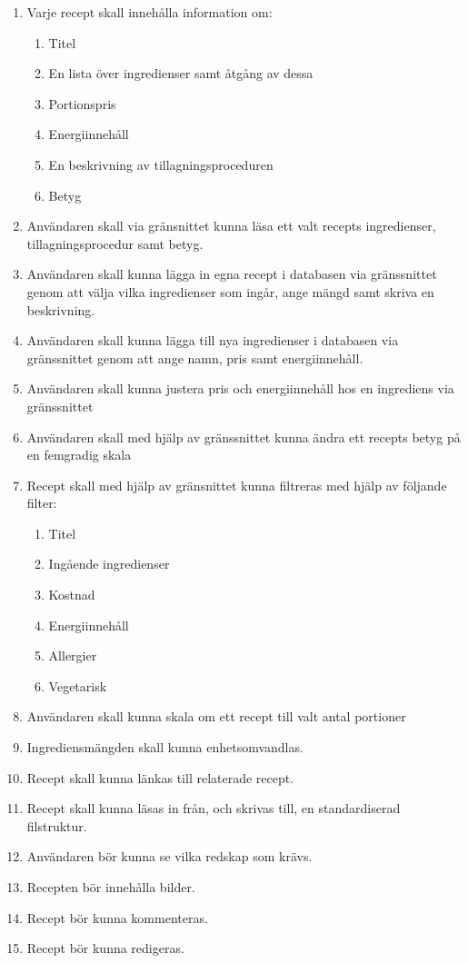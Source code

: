 \renewcommand{\labelenumii}{\theenumii}
\renewcommand{\theenumii}{\theenumi.\arabic{enumii}.}

\begin{enumerate}
\item Varje recept skall innehålla information om:
  \begin{enumerate}
    \item Titel
    \item En lista över ingredienser samt åtgång av dessa
    \item Portionspris
    \item Energiinnehåll
    \item En beskrivning av tillagningsproceduren
    \item Betyg
  \end{enumerate}
\item Användaren skall via gränsnittet kunna läsa ett valt recepts ingredienser, tillagningsprocedur samt betyg.
\item Användaren skall kunna lägga in egna recept i databasen via gränssnittet genom att välja vilka ingredienser som ingår, ange mängd samt skriva en beskrivning.
\item Användaren skall kunna lägga till nya ingredienser i databasen via gränssnittet genom att ange namn, pris samt energiinnehåll.
\item Användaren skall kunna justera pris och energiinnehåll hos en ingrediens via gränssnittet
\item Användaren skall med hjälp av gränssnittet kunna ändra ett recepts betyg på en femgradig skala
\item Recept skall med hjälp av gränsnittet kunna filtreras med hjälp av följande filter:
  \begin{enumerate}
    \item Titel
    \item Ingående ingredienser
    \item Kostnad
    \item Energiinnehåll
    \item Allergier
    \item Vegetarisk
  \end{enumerate}
\item Användaren skall kunna skala om ett recept till valt antal portioner
\item Ingrediensmängden skall kunna enhetsomvandlas.
\item Recept skall kunna länkas till relaterade recept.
\item Recept skall kunna läsas in från, och skrivas till, en standardiserad filstruktur.
\item Användaren bör kunna se vilka redskap som krävs.
\item Recepten bör innehålla bilder.
\item Recept bör kunna kommenteras.
\item Recept bör kunna redigeras.
\end{enumerate}
